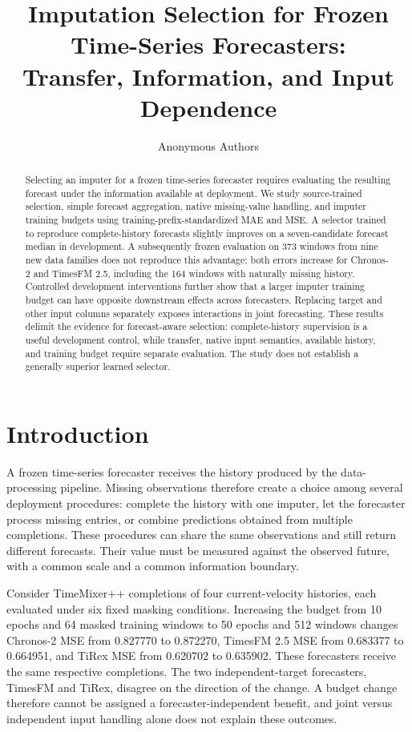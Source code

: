 \documentclass{article}
\title{Imputation Selection for Frozen Time-Series Forecasters:\\Transfer, Information, and Input Dependence}
\author{Anonymous Authors}
\begin{document}
\maketitle

\begin{abstract}
Selecting an imputer for a frozen time-series forecaster requires evaluating the resulting forecast under the information available at deployment. We study source-trained selection, simple forecast aggregation, native missing-value handling, and imputer training budgets using training-prefix-standardized MAE and MSE. A selector trained to reproduce complete-history forecasts slightly improves on a seven-candidate forecast median in development. A subsequently frozen evaluation on 373 windows from nine new data families does not reproduce this advantage: both errors increase for Chronos-2 and TimesFM 2.5, including the 164 windows with naturally missing history. Controlled development interventions further show that a larger imputer training budget can have opposite downstream effects across forecasters. Replacing target and other input columns separately exposes interactions in joint forecasting. These results delimit the evidence for forecast-aware selection: complete-history supervision is a useful development control, while transfer, native input semantics, available history, and training budget require separate evaluation. The study does not establish a generally superior learned selector.
\end{abstract}

\section{Introduction}

A frozen time-series forecaster receives the history produced by the data-processing pipeline. Missing observations therefore create a choice among several deployment procedures: complete the history with one imputer, let the forecaster process missing entries, or combine predictions obtained from multiple completions. These procedures can share the same observations and still return different forecasts. Their value must be measured against the observed future, with a common scale and a common information boundary.

Consider TimeMixer++ completions of four current-velocity histories, each evaluated under six fixed masking conditions. Increasing the budget from 10 epochs and 64 masked training windows to 50 epochs and 512 windows changes Chronos-2 MSE from 0.827770 to 0.872270, TimesFM 2.5 MSE from 0.683377 to 0.664951, and TiRex MSE from 0.620702 to 0.635902. These forecasters receive the same respective completions. The two independent-target forecasters, TimesFM and TiRex, disagree on the direction of the change. A budget change therefore cannot be assigned a forecaster-independent benefit, and joint versus independent input handling alone does not explain these outcomes.
\end{document}
